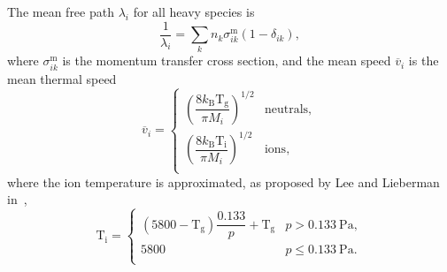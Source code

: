 The mean free path $\lambda_{i}$ for all heavy species is
\begin{equation}
    \frac{1}{\lambda_{i}} = \sum_{k}n_{k}\sigma^{\mathrm{m}}_{ik} (1-\delta_{ik})
    ,
\end{equation}
where $\sigma^{\mathrm{m}}_{ik}$ is the momentum transfer cross section, and the mean speed $\overline{v}_{i}$ is the
mean thermal speed
\begin{equation}
    \overline{v}_{i} =
    \begin{cases}
        \left( \dfrac{8 k_{\mathrm{B}} \mathrm{T}_\mathrm{g}}{\pi M_{i}} \right)^{1/2} & \mathrm{neutrals}, \\
        \left( \dfrac{8 k_{\mathrm{B}} \mathrm{T}_\mathrm{i}}{\pi M_{i}} \right)^{1/2} & \mathrm{ions}, \\
    \end{cases}
\end{equation}
where the ion temperature is approximated, as proposed by Lee and Lieberman in~\cite{lee_global_1995},
\begin{equation}
    \mathrm{T_{i}} =
    \begin{cases}
        \left( 5800 - \mathrm{T_g} \right) \dfrac{0.133}{p} + \mathrm{T_g} & p > 0.133~\mathrm{Pa}, \\
        5800 & p \le 0.133~\mathrm{Pa}. \\
    \end{cases}
\end{equation}

